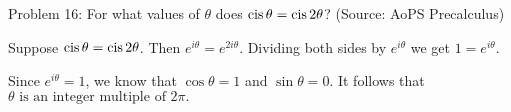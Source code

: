 Problem 16: For what values of $\theta$ does $\mathop{{\rm cis}} \theta = \mathop{{\rm cis}} 2\theta$? (Source: AoPS Precalculus)

Suppose $\mathop{\rm cis} \theta = \mathop{\rm cis} 2\theta$. Then $e^{i \theta} = e^{2i \theta}$. Dividing both sides by $e^{i \theta}$ we get $1 = e^{i \theta}$.

Since $e^{i \theta} = 1$, we know that $\cos \theta = 1$ and $\sin \theta = 0$. It follows that $\boxed{\theta \text{ is an integer multiple of } 2 \pi.} $
